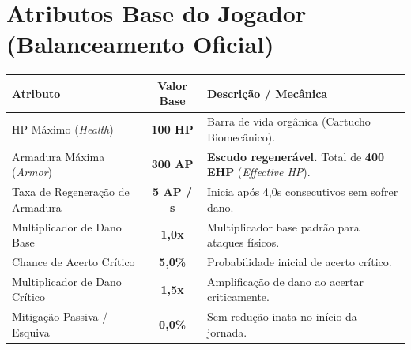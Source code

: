 \documentclass[a4paper,12pt]{report}
\begin{document}
\section{Atributos Base do Jogador (Balanceamento Oficial)}
\begin{center}
\begin{tabular}{|l|c|l|}
    \hline
    \textbf{Atributo} & \textbf{Valor Base} & \textbf{Descrição / Mecânica} \\
    \hline
    HP Máximo (\textit{Health}) & \textbf{100 HP} & Barra de vida orgânica (Cartucho Biomecânico). \\
    Armadura Máxima (\textit{Armor}) & \textbf{300 AP} & \textbf{Escudo regenerável.} Total de \textbf{400 EHP} (\textit{Effective HP}). \\
    Taxa de Regeneração de Armadura & \textbf{5 AP / s} & Inicia após 4,0s consecutivos sem sofrer dano. \\
    Multiplicador de Dano Base & \textbf{1,0x} & Multiplicador base padrão para ataques físicos. \\
    Chance de Acerto Crítico & \textbf{5,0\%} & Probabilidade inicial de acerto crítico. \\
    Multiplicador de Dano Crítico & \textbf{1,5x} & Amplificação de dano ao acertar criticamente. \\
    Mitigação Passiva / Esquiva & \textbf{0,0\%} & Sem redução inata no início da jornada. \\
    \hline
\end{tabular}
\end{center}
\end{document}
